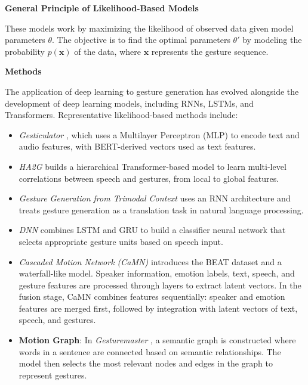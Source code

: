 \textbf{General Principle of Likelihood-Based Models}

These models work by maximizing the likelihood of observed data given model parameters $\theta$. The objective is to find the optimal parameters $\theta'$ by modeling the probability $p(\mathbf{x})$ of the data, where $\mathbf{x}$ represents the gesture sequence.

\textbf{Methods}

The application of deep learning to gesture generation has evolved alongside the development of deep learning models, including RNNs, LSTMs, and Transformers. Representative likelihood-based methods include:

\begin{itemize}[]
	\item \textit{Gesticulator} \cite{kucherenko2020gesticulator}, which uses a Multilayer Perceptron (MLP) to encode text and audio features, with BERT-derived vectors used as text features.

	\item \textit{HA2G} \cite{liu2022learning} builds a hierarchical Transformer-based model to learn multi-level correlations between speech and gestures, from local to global features.

	\item \textit{Gesture Generation from Trimodal Context} \cite{yoon2020speech} uses an RNN architecture and treats gesture generation as a translation task in natural language processing.

	\item \textit{DNN} \cite{chiu2015predicting} combines LSTM and GRU to build a classifier neural network that selects appropriate gesture units based on speech input.

	\item \textit{Cascaded Motion Network (CaMN)} \cite{liu2022beat} introduces the BEAT dataset and a waterfall-like model. Speaker information, emotion labels, text, speech, and gesture features are processed through layers to extract latent vectors. In the fusion stage, CaMN combines features sequentially: speaker and emotion features are merged first, followed by integration with latent vectors of text, speech, and gestures.

	\item \textbf{Motion Graph}: In \textit{Gesturemaster} \cite{zhou2022gesturemaster}, a semantic graph is constructed where words in a sentence are connected based on semantic relationships. The model then selects the most relevant nodes and edges in the graph to represent gestures.
\end{itemize}


